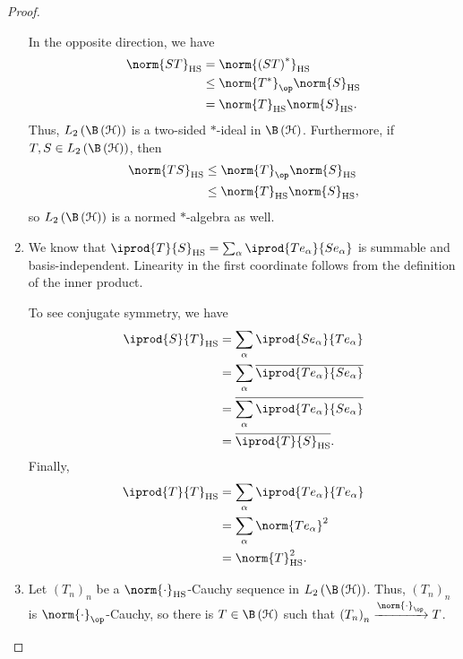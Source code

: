 \documentclass[10pt]{mypackage}
\DeclareMathOperator{\hs}{HS}
\begin{document}
\begin{proof}
\begin{enumerate}[(1)]
      In the opposite direction, we have
      \begin{align*}
        \norm{ST}_{\hs} &= \norm{\left( ST \right)^{\ast}}_{\hs}\\
                        &\leq \norm{T^{\ast}}_{\op}\norm{S}_{\hs}\\
                        &= \norm{T}_{\hs}\norm{S}_{\hs}.
      \end{align*}
      Thus, $L_2\left( \B\left( \mathcal{H} \right) \right)$ is a two-sided $\ast$-ideal in $\B\left( \mathcal{H} \right)$. Furthermore, if $T,S\in L_2\left( \B\left( \mathcal{H} \right) \right)$, then
      \begin{align*}
        \norm{TS}_{\hs} &\leq \norm{T}_{\op}\norm{S}_{\hs}\\
                        &\leq \norm{T}_{\hs}\norm{S}_{\hs},
      \end{align*}
      so $L_2\left( \B\left( \mathcal{H} \right) \right)$ is a normed $\ast$-algebra as well.
    \item We know that $ \iprod{T}{S}_{\hs} = \sum_{\alpha} \iprod{Te_{\alpha}}{Se_{\alpha}} $ is summable and basis-independent. Linearity in the first coordinate follows from the definition of the inner product.\newline

      To see conjugate symmetry, we have
      \begin{align*}
        \iprod{S}{T}_{\hs} &= \sum_{\alpha} \iprod{Se_{\alpha}}{Te_{\alpha}}\\
                           &= \sum_{\alpha} \overline{\iprod{Te_{\alpha}}{Se_{\alpha}}}\\
                           &= \overline{\sum_{\alpha} \iprod{Te_{\alpha}}{Se_{\alpha}}}\\
                           &= \overline{ \iprod{T}{S}_{\hs} }.
      \end{align*}
      Finally,
      \begin{align*}
        \iprod{T}{T}_{\hs} &= \sum_{\alpha} \iprod{Te_{\alpha}}{Te_{\alpha}}\\
                           &= \sum_{\alpha} \norm{Te_{\alpha}}^2\\
                           &= \norm{T}_{\hs}^2.
      \end{align*}
    \item Let $\left( T_n \right)_n$ be a $\norm{\cdot}_{\hs}$-Cauchy sequence in $L_2\left( \B\left( \mathcal{H} \right) \right)$. Thus, $\left( T_n \right)_n$ is $\norm{\cdot}_{\op}$-Cauchy, so there is $T\in \B\left( \mathcal{H} \right)$ such that $\left( T_n \right)_n\xrightarrow{\norm{\cdot}_{\op}} T$.\newline


\end{enumerate}
\end{proof}
\end{document}
